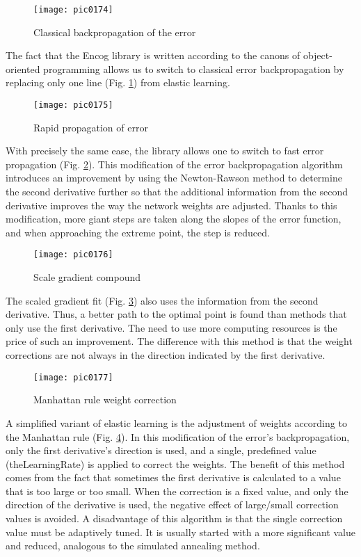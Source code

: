 \begin{figure}[h]
\centering
\texttt{[image: pic0174]}
\caption{Classical backpropagation of the error}
\label{fig:pic0174}
\end{figure}
\FloatBarrier

The fact that the Encog library is written according to the canons of object-oriented programming allows us to switch to classical error backpropagation by replacing only one line (Fig. \ref{fig:pic0174}) from elastic learning.

\begin{figure}[h]
\centering
\texttt{[image: pic0175]}
\caption{Rapid propagation of error}
\label{fig:pic0175}
\end{figure}
\FloatBarrier

With precisely the same ease, the library allows one to switch to fast error propagation (Fig. \ref{fig:pic0175}). This modification of the error backpropagation algorithm introduces an improvement by using the Newton-Rawson method to determine the second derivative further so that the additional information from the second derivative improves the way the network weights are adjusted. Thanks to this modification, more giant steps are taken along the slopes of the error function, and when approaching the extreme point, the step is reduced.

\begin{figure}[h]
\centering
\texttt{[image: pic0176]}
\caption{Scale gradient compound}
\label{fig:pic0176}
\end{figure}
\FloatBarrier

The scaled gradient fit (Fig. \ref{fig:pic0176}) also uses the information from the second derivative. Thus, a better path to the optimal point is found than methods that only use the first derivative. The need to use more computing resources is the price of such an improvement. The difference with this method is that the weight corrections are not always in the direction indicated by the first derivative.

\begin{figure}[h]
\centering
\texttt{[image: pic0177]}
\caption{Manhattan rule weight correction}
\label{fig:pic0177}
\end{figure}
\FloatBarrier

A simplified variant of elastic learning is the adjustment of weights according to the Manhattan rule (Fig. \ref{fig:pic0177}). In this modification of the error's backpropagation, only the first derivative's direction is used, and a single, predefined value (theLearningRate) is applied to correct the weights. The benefit of this method comes from the fact that sometimes the first derivative is calculated to a value that is too large or too small. When the correction is a fixed value, and only the direction of the derivative is used, the negative effect of large/small correction values is avoided. A disadvantage of this algorithm is that the single correction value must be adaptively tuned. It is usually started with a more significant value and reduced, analogous to the simulated annealing method.

